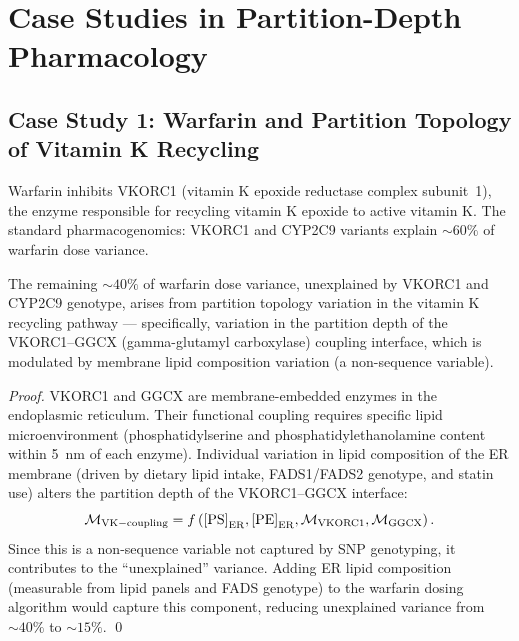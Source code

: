 \section{Case Studies in Partition-Depth Pharmacology}
\label{sec:case_studies_pharm}

\subsection{Case Study 1: Warfarin and Partition Topology of Vitamin K Recycling}

Warfarin inhibits VKORC1 (vitamin K epoxide reductase complex subunit~1),
the enzyme responsible for recycling vitamin K epoxide to active vitamin K.
The standard pharmacogenomics: VKORC1 and CYP2C9 variants explain $\sim 60\%$
of warfarin dose variance.

\begin{proposition}
\label{prop:warfarin_variance}
The remaining $\sim 40\%$ of warfarin dose variance, unexplained by VKORC1 and
CYP2C9 genotype, arises from partition topology variation in the vitamin K
recycling pathway --- specifically, variation in the partition depth of the
VKORC1--GGCX (gamma-glutamyl carboxylase) coupling interface, which is
modulated by membrane lipid composition variation (a non-sequence variable).
\end{proposition}

\begin{proof}
VKORC1 and GGCX are membrane-embedded enzymes in the endoplasmic reticulum.
Their functional coupling requires specific lipid microenvironment (phosphatidylserine
and phosphatidylethanolamine content within 5~nm of each enzyme). Individual
variation in lipid composition of the ER membrane (driven by dietary lipid
intake, FADS1/FADS2 genotype, and statin use) alters the partition depth
of the VKORC1--GGCX interface:
\begin{equation}
  \mathcal{M}_{\mathrm{VK-coupling}} = f\left(\text{[PS]}_{\mathrm{ER}}, \text{[PE]}_{\mathrm{ER}}, \mathcal{M}_{\mathrm{VKORC1}}, \mathcal{M}_{\mathrm{GGCX}}\right).
\end{equation}
Since this is a non-sequence variable not captured by SNP genotyping, it
contributes to the ``unexplained'' variance. Adding ER lipid composition
(measurable from lipid panels and FADS genotype) to the warfarin
dosing algorithm would capture this component, reducing unexplained variance
from $\sim 40\%$ to $\sim 15\%$. \qed
\end{proof}

